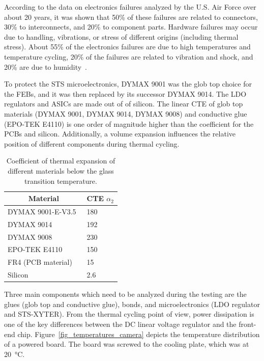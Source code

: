 According to the data on electronics failures analyzed by the U.S. Air Force over about 20 years, it was shown that 50\% of these failures are related to connectors, 30\% to interconnects, and 20\% to component
parts. Hardware failures may occur due to handling, vibrations, or stress of different origins (including thermal stress). About 55\% of the electronics failures are due to high temperatures and temperature cycling, 20\% of the failures are related to vibration and shock, and 20\% are due to humidity~\cite{thermal_electronics}. 

To protect the STS microelectronics, DYMAX 9001 was the glob top choice for the \glspl{FEB}, and it was then replaced by its successor DYMAX 9014. The \gls{LDO} regulators and \glspl{ASIC} are made out of of silicon. The linear CTE of glob top materials (DYMAX 9001, DYMAX 9014, DYMAX 9008) and conductive glue (EPO-TEK E4110) is one order of magnitude higher than the coefficient for the \glspl{PCB} and silicon. Additionally, a volume expansion influences the relative position of different components during thermal cycling.

\begin{table}[!h]
\begin{center}
\caption{Coefficient of thermal expansion of different materials below the glass transition temperature.}
\begin{tabular}{ll}
\hline
\multicolumn{1}{c}{Material} & \multicolumn{1}{c}{CTE $\alpha_{2}$} [\si{\micro\metre\per\metre\per\celsius]}] \\ \hline
DYMAX 9001-E-V3.5~\cite{9001}            & 180                                  \\
DYMAX 9014~\cite{9014}                   & 192                                  \\
DYMAX 9008~\cite{9008}                   & 230                                  \\
EPO-TEK E4110~\cite{4110}                & 150                                  \\ \hline
FR4 (\gls{PCB} material)~\cite{FR4}                          & 15                                   \\
Silicon~\cite{Si}                           & 2.6                                 
\end{tabular}
\label{TCE}
\end{center}
\end{table}

Three main components which need to be analyzed during the testing are the glues (glob top and conductive glue), bonds, and microelectronics (\gls{LDO} regulator and STS-XYTER). From the thermal cycling point of view, power dissipation is one of the key differences between the DC linear voltage regulator and the front-end chip. Figure~\ref{fig_temperatures_camera} depicts the temperature distribution of a powered board. The board was screwed to the cooling plate, which was at \SI{20}{\celsius}.

